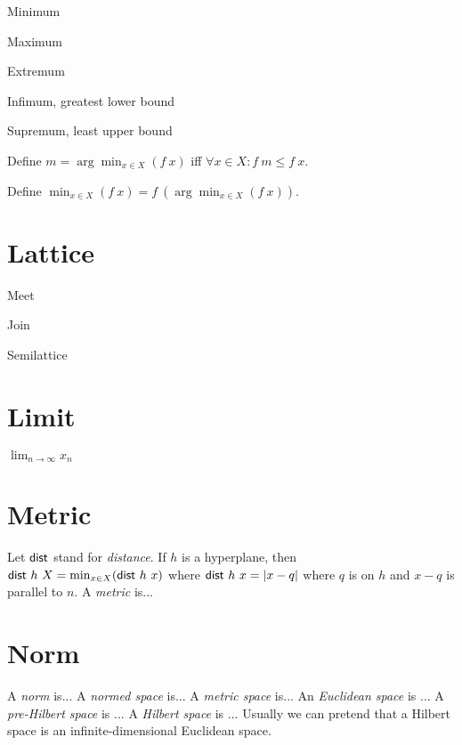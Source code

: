 Minimum

Maximum

Extremum

Infimum, greatest lower bound

Supremum, least upper bound

%
Define \(m = \arg\min_{x \in X}(f~x)\) iff \(\forall x \in X : f~m \le f~x\).

%
Define \(\min_{x \in X}(f~x) = f~(\arg\min_{x \in X}(f~x))\).

\section{Lattice}

Meet

Join

Semilattice

\section{Limit}

\(\lim_{n \to \infty} x_n\)

\section{Metric}

%
%
Let \(\textsf{dist}\) stand for \emph{distance}.
If \(h\) is a hyperplane,
then \(\textsf{dist}~h~X = \min_{x \in X} (\textsf{dist}~h~x)\)
where \(\textsf{dist}~h~x = |x-q|\) where \(q\) is on \(h\) and \(x-q\) is parallel to \(n\).
%
A \emph{metric} is...

\section{Norm}

%
A \emph{norm} is...
%
%
A \emph{normed space} is...
%
%
A \emph{metric space} is...
%
%
An \emph{Euclidean space} is ...
%
%
A \emph{pre-Hilbert space} is ...
%
%
A \emph{Hilbert space} is ...
Usually we can pretend that a Hilbert space is an infinite-dimensional Euclidean space.

